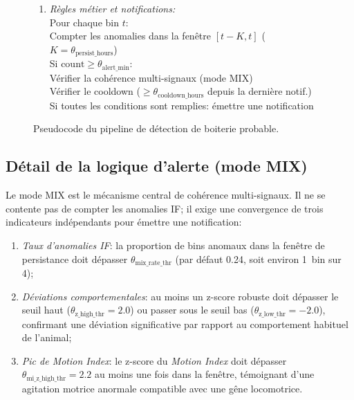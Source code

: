 \begin{figure}[H]
{{\begin{enumerate}[leftmargin=1.5em]
\item \textit{Règles métier et notifications:}\\
    Pour chaque bin $t$:\\
    \hspace{1em} Compter les anomalies dans la fenêtre $[t - K, t]$ ($K = \theta_{\text{persist\_hours}}$)\\
    \hspace{1em} Si $\text{count} \geq \theta_{\text{alert\_min}}$:\\
    \hspace{2em} Vérifier la cohérence multi-signaux (mode MIX)\\
    \hspace{2em} Vérifier le cooldown ($\geq \theta_{\text{cooldown\_hours}}$ depuis la dernière notif.)\\
    \hspace{2em} Si toutes les conditions sont remplies: émettre une notification
\end{enumerate}
}}
\caption{Pseudocode du pipeline de détection de boiterie probable.}
\label{alg:pipeline}
\end{figure}

\subsection{Détail de la logique d'alerte (mode MIX)}
Le mode MIX est le mécanisme central de cohérence multi-signaux. Il ne se contente pas de
compter les anomalies IF; il exige une convergence de trois indicateurs indépendants pour
émettre une notification:

\begin{enumerate}
    \item \textit{Taux d'anomalies IF}: la proportion de bins anomaux dans la fenêtre de
    persistance doit dépasser $\theta_{\text{mix\_rate\_thr}}$ (par défaut 0.24, soit
    environ 1~bin sur 4);
    \item \textit{Déviations comportementales}: au moins un z-score robuste doit dépasser
    le seuil haut ($\theta_{\text{z\_high\_thr}} = 2.0$) ou passer sous le seuil bas
    ($\theta_{\text{z\_low\_thr}} = -2.0$), confirmant une déviation significative par
    rapport au comportement habituel de l'animal;
    \item \textit{Pic de Motion Index}: le z-score du \textit{Motion Index} doit dépasser
    $\theta_{\text{mi\_z\_high\_thr}} = 2.2$ au moins une fois dans la fenêtre,
    témoignant d'une agitation motrice anormale compatible avec une gêne locomotrice.
\end{enumerate}

